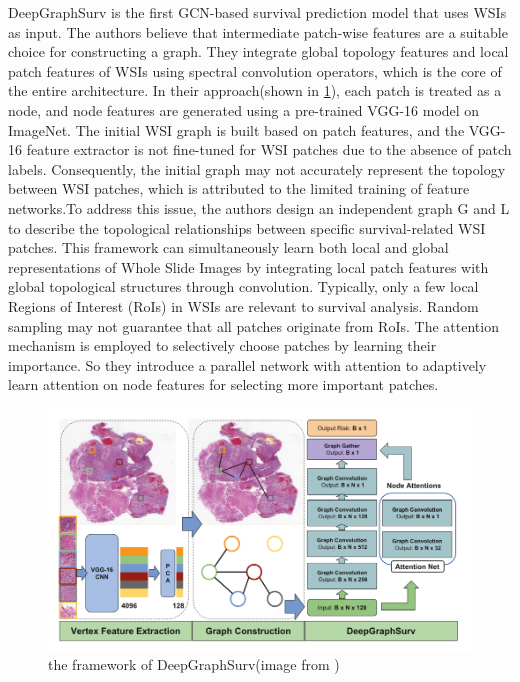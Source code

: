 \documentclass[journal,twoside,web]{ieeecolor}
\begin{document}
DeepGraphSurv\cite{li2018graph} is the first GCN-based survival prediction model that uses WSIs as input. The authors believe that intermediate patch-wise features are a suitable choice for constructing a graph. They integrate global topology features and local patch features of WSIs using spectral convolution operators, which is the core of the entire architecture. In their approach(shown in \ref{DeepGraphSurv}), each patch is treated as a node, and node features are generated using a pre-trained VGG-16 model on ImageNet. The initial WSI graph is built based on patch features, and the VGG-16 feature extractor is not fine-tuned for WSI patches due to the absence of patch labels. Consequently, the initial graph may not accurately represent the topology between WSI patches, which is attributed to the limited training of feature networks.To address this issue, the authors design an independent graph G and  L to describe the topological relationships between specific survival-related WSI patches. This framework can simultaneously learn both local and global representations of Whole Slide Images by integrating local patch features with global topological structures through convolution. Typically, only a few local Regions of Interest (RoIs) in WSIs are relevant to survival analysis. Random sampling may not guarantee that all patches originate from RoIs. The attention mechanism is employed to selectively choose patches by learning their importance. So they introduce a parallel network with attention to adaptively learn attention on node features for selecting more important patches.
\begin{figure}
    \centering
    \includegraphics[width=0.8\linewidth]{img/deepgraphsurv.png}
    \caption{the framework of DeepGraphSurv(image from \cite{li2018graph})}
    \label{DeepGraphSurv}
\end{figure}
\end{document}
